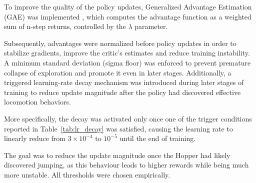 To improve the quality of the policy updates, Generalized Advantage Estimation (GAE)
was implemented \cite{SchulmanGAE2015}, which computes the advantage function as a weighted sum of n-step returns, controlled by the $\lambda$ parameter.

Subsequently, advantages were normalized before policy updates in order to stabilize gradients,
improve the critic's estimates and reduce training instability. A minimum standard deviation (sigma floor)
was enforced to prevent premature collapse of exploration and promote it even in later stages.
Additionally, a triggered learning-rate decay mechanism was introduced during later stages of training to reduce
update magnitude after the policy had discovered effective locomotion behaviors.


More specifically, the decay was activated only once one of the trigger conditions reported in Table~\ref{tab:lr_decay}
was satisfied, causing the learning rate to linearly reduce from $3 \times 10^{-4}$ to $10^{-5}$ until the end of training.

\begin{table}[ht]
\centering
\caption{Learning Rate Decay Triggers}
\label{tab:lr_decay}
\end{table}

The goal was to reduce the update magnitude once the Hopper had likely discovered jumping, as this behaviour leads to
higher rewards while being much more unstable. All thresholds were chosen empirically.


